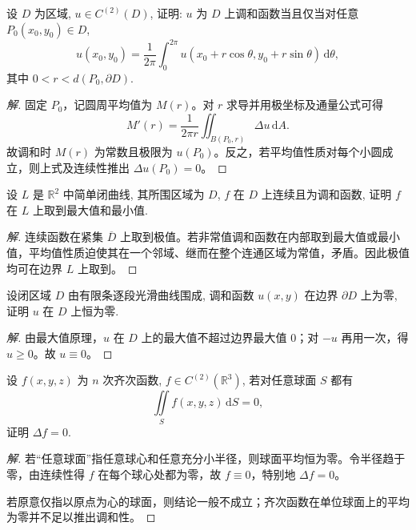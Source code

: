 \documentclass[../../数学分析培优讲义(答案版).tex]{subfiles}
\begin{document}
\begin{example}
设 $D$ 为区域, $u\in C^{(2)}(D)$, 证明: $u$ 为 $D$ 上调和函数当且仅当对任意 $P_0(x_0,y_0)\in D$,
\[
    u(x_0,y_0)=\dfrac{1}{2\pi}\int_0^{2\pi}u(x_0+r\cos\theta,y_0+r\sin\theta)\,\mathrm{d}\theta,
\]
其中 $0<r<d(P_0,\partial D)$.
\end{example}

\begin{proof}[解]
固定 $P_0$，记圆周平均值为 $M(r)$。对 $r$ 求导并用极坐标及通量公式可得
\[
M'(r)=\dfrac{1}{2\pi r}\iint_{B(P_0,r)}\Delta u\,\mathrm{d}A.
\]
故调和时 $M(r)$ 为常数且极限为 $u(P_0)$。反之，若平均值性质对每个小圆成立，则上式及连续性推出 $\Delta u(P_0)=0$。
\end{proof}

\begin{example}
设 $L$ 是 $\mathbb{R}^2$ 中简单闭曲线, 其所围区域为 $D$, $f$ 在 $D$ 上连续且为调和函数, 证明 $f$ 在 $L$ 上取到最大值和最小值.
\end{example}

\begin{proof}[解]
连续函数在紧集 $\overline D$ 上取到极值。若非常值调和函数在内部取到最大值或最小值，平均值性质迫使其在一个邻域、继而在整个连通区域为常值，矛盾。因此极值均可在边界 $L$ 上取到。
\end{proof}

\begin{example}
设闭区域 $D$ 由有限条逐段光滑曲线围成, 调和函数 $u(x,y)$ 在边界 $\partial D$ 上为零, 证明 $u$ 在 $D$ 上恒为零.
\end{example}

\begin{proof}[解]
由最大值原理，$u$ 在 $D$ 上的最大值不超过边界最大值 $0$；对 $-u$ 再用一次，得 $u\geq0$。故 $u\equiv0$。
\end{proof}

\begin{example}
设 $f(x,y,z)$ 为 $n$ 次齐次函数, $f\in C^{(2)}(\mathbb{R}^3)$, 若对任意球面 $S$ 都有
\[
    \iint\limits_Sf(x,y,z)\,\mathrm{d}S=0,
\]
证明 $\Delta f=0$.
\end{example}

\begin{proof}[解]
若“任意球面”指任意球心和任意充分小半径，则球面平均恒为零。令半径趋于零，由连续性得 $f$ 在每个球心处都为零，故 $f\equiv0$，特别地 $\Delta f=0$。

若原意仅指以原点为心的球面，则结论一般不成立；齐次函数在单位球面上的平均为零并不足以推出调和性。
\end{proof}
\end{document}
